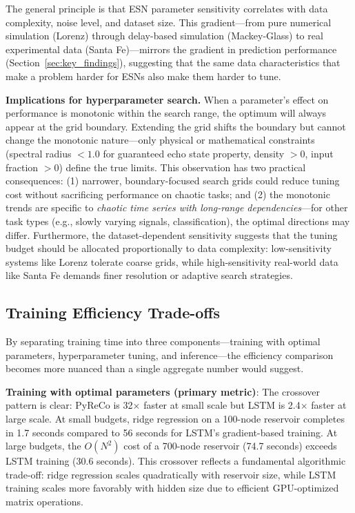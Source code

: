 The general principle is that ESN parameter sensitivity correlates with data complexity, noise level, and dataset size. This gradient---from pure numerical simulation (Lorenz) through delay-based simulation (Mackey-Glass) to real experimental data (Santa Fe)---mirrors the gradient in prediction performance (Section~\ref{sec:key_findings}), suggesting that the same data characteristics that make a problem harder for ESNs also make them harder to tune.

\textbf{Implications for hyperparameter search.} When a parameter's effect on performance is monotonic within the search range, the optimum will always appear at the grid boundary. Extending the grid shifts the boundary but cannot change the monotonic nature---only physical or mathematical constraints (spectral radius $< 1.0$ for guaranteed echo state property, density $> 0$, input fraction $> 0$) define the true limits. This observation has two practical consequences: (1) narrower, boundary-focused search grids could reduce tuning cost without sacrificing performance on chaotic tasks; and (2) the monotonic trends are specific to \emph{chaotic time series with long-range dependencies}---for other task types (e.g., slowly varying signals, classification), the optimal directions may differ. Furthermore, the dataset-dependent sensitivity suggests that the tuning budget should be allocated proportionally to data complexity: low-sensitivity systems like Lorenz tolerate coarse grids, while high-sensitivity real-world data like Santa Fe demands finer resolution or adaptive search strategies.

\subsection{Training Efficiency Trade-offs}
\label{sec:efficiency_discussion}

By separating training time into three components---training with optimal parameters, hyperparameter tuning, and inference---the efficiency comparison becomes more nuanced than a single aggregate number would suggest.

\textbf{Training with optimal parameters (primary metric)}: The crossover pattern is clear: PyReCo is 32$\times$ faster at small scale but LSTM is 2.4$\times$ faster at large scale. At small budgets, ridge regression on a 100-node reservoir completes in 1.7 seconds compared to 56 seconds for LSTM's gradient-based training. At large budgets, the $O(N^2)$ cost of a 700-node reservoir (74.7 seconds) exceeds LSTM training (30.6 seconds). This crossover reflects a fundamental algorithmic trade-off: ridge regression scales quadratically with reservoir size, while LSTM training scales more favorably with hidden size due to efficient GPU-optimized matrix operations.

